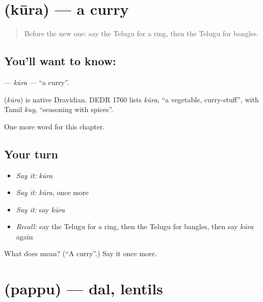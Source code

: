 \section[\texorpdfstring{\te{కూర} (kūra)}{కూర (kūra)}]{ (kūra) — a curry}

\label{lesson:TE-C115-kura}



\begin{quote}
Before the new one: say the Telugu for a ring, then the Telugu for bangles.
\end{quote}

\subsection*{You'll want to know: }
\textbf{} — \emph{kūra} — \textquotedblleft{}a curry\textquotedblright{}.

\begin{cousinweb}
\textbf{} (\emph{kūra}) is native Dravidian. DEDR 1760 lists \emph{kūra}, \textquotedblleft{}a vegetable, curry-stuff\textquotedblright{}, with Tamil \emph{kuy}, \textquotedblleft{}seasoning with spices\textquotedblright{}.
\end{cousinweb}

\begin{grammarlens}[title={What you've built}]
One more word for this chapter.
\end{grammarlens}

\subsection*{Your turn}
\begin{itemize}
\raggedright
  \item \emph{Say it:} \emph{kūra}
  \item \emph{Say it:} \emph{kūra}, once more
  \item \emph{Say it:} say \emph{kūra}
  \item \emph{Recall:} say the Telugu for a ring, then the Telugu for bangles, then say \emph{kūra} again
\end{itemize}

\begin{tcolorbox}[breakable,colback=teal!4,colframe=teal!35!black,title={Before you move on}]
What does  mean? (\textquotedblleft{}A curry\textquotedblright{}.) Say it once more.
\end{tcolorbox}
\section[\texorpdfstring{\te{పప్పు} (pappu)}{పప్పు (pappu)}]{ (pappu) — dal, lentils}

